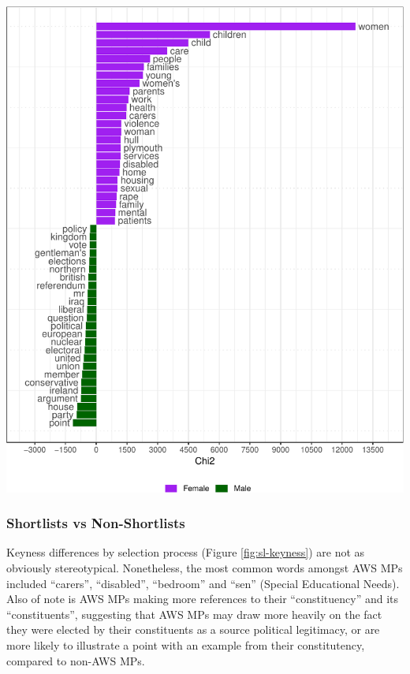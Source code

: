 \documentclass[]{article}
\let\origfigure\figure
\let\endorigfigure\endfigure
\renewenvironment{figure}[1][2] {
    \expandafter\origfigure\expandafter[H]
} {
    \endorigfigure
}
\theoremstyle{definition}
\theoremstyle{definition}
\theoremstyle{definition}
\theoremstyle{remark}
\begin{document}
\begin{figure}
\centering
\includegraphics{methodology_files/figure-latex/gender-keyness-plot-1.pdf}
\caption{\label{fig:gender-keyness-plot}Keyness between Labour MPs, by
Gender}
\end{figure}

\hypertarget{shortlists-vs-non-shortlists-1}{%
\subsubsection{Shortlists vs
Non-Shortlists}\label{shortlists-vs-non-shortlists-1}}

Keyness differences by selection process (Figure \ref{fig:sl-keyness})
are not as obviously stereotypical. Nonetheless, the most common words
amongst AWS MPs included ``carers'', ``disabled'', ``bedroom'' and
``sen'' (Special Educational Needs). Also of note is AWS MPs making more
references to their ``constituency'' and its ``constituents'',
suggesting that AWS MPs may draw more heavily on the fact they were
elected by their constituents as a source political legitimacy, or are
more likely to illustrate a point with an example from their
constitutency, compared to non-AWS MPs.
\end{document}
